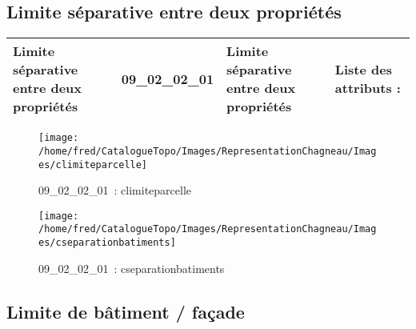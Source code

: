 \documentclass[12pt,titlepage]{book}
\begin{document}
\subsection{Limite séparative entre deux propriétés}
\noindent
\vspace{\baselineskip}

\renewcommand{\arraystretch}{1.2}
\begin{supertabular}{|p{10cm}|c|p{13cm}|p{12cm}|}
 Limite séparative entre deux propriétés & 09\_02\_02\_01 & Limite séparative entre deux propriétés & Liste des attributs :
\begin{enumerate}
\end{enumerate}
\\
\hline
\end{supertabular}
\begin{figure}[h!]
  \hfill         %
  \begin{minipage}[t]{3cm}
    \begin{center}
      \texttt{[image: /home/fred/CatalogueTopo/Images/RepresentationChagneau/Images/climiteparcelle]}
      \caption[~09\_02\_02\_01]{\small{09\_02\_02\_01~:} \tiny{climiteparcelle}}\label{climiteparcelle}
    \end{center}
  \end{minipage}
  \begin{minipage}[t]{3cm}
    \begin{center}
      \texttt{[image: /home/fred/CatalogueTopo/Images/RepresentationChagneau/Images/cseparationbatiments]}
      \caption[~09\_02\_02\_01]{\small{09\_02\_02\_01~:} \tiny{cseparationbatiments}}\label{cseparationbatiments}
    \end{center}
  \end{minipage}
\end{figure}


\subsection{Limite de bâtiment / façade}
\noindent
\vspace{\baselineskip}
\end{document}
